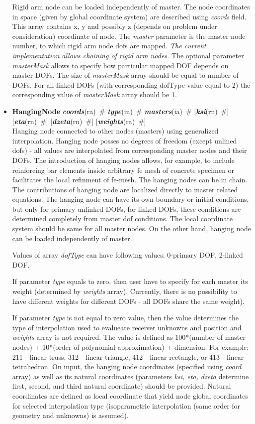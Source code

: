 \documentclass[draft]{article}
\newcommand{\param}[1]{{\em #1}}
\newcommand{\keywordnotype}[1]{\mbox{{\it{\bf{#1}}}}}
\newcommand{\keyword}[2]{\mbox{{\keywordnotype{#1}\tiny (#2)}}}
\newcommand{\entKeywordInst}[1]{\mbox{{\bf{{#1}}}}}
\newcommand{\field}[2]{\mbox{\keyword{#1}{#2}~\#}}
\newcommand{\optField}[2]{\mbox{[\field{#1}{#2}]}}
\begin{document}
\begin{itemize}
Rigid arm node can be loaded
independently of master. The node coordinates in space (given by
global coordinate system) are described using \param{coords}
field. This array contains x, y and possibly z (depends on problem
under consideration) coordinate of node. The \param{master} parameter is the
master node number, to which rigid arm node dofs are mapped.
{\em The current implementation allows chaining of rigid arm nodes.}
The optional parameter \param{masterMask} allows to specify how
particular mapped DOF depends on master DOFs. The size of \param{masterMask} array 
should be equal to number of DOFs. For all linked DOFs (with
corresponding dofType value equal to 2) the corresponding value of
\param{masterMask} array should be 1.

\item
\entKeywordInst{HangingNode}  \field{coords}{ra} \field{type}{in} \field{masters}{ia}
\optField{ksi}{rn} \optField{eta}{rn} \optField{dzeta}{rn} \optField{weights}{ra}\\
Hanging node connected to other nodes (masters) using generalized interpolation.
Hanging node posses no degrees of freedom	(except unlined dofs) - all values are
interpolated from corresponding master nodes and their DOFs.
The introduction of hanging nodes allows, for example, to include reinforcing bar elements inside 
arbitrary fe mesh of concrete specimen or facilitates the local
refinment of fe-mesh. The hanging nodes can be in chain.
The contributions of hanging node are localized directly to master related equations.
The hanging node can have its own boundary or initial conditions, but
only for primary unlinked DOFs, for linked DOFs, these conditions are
determined completely from master dof conditions. 
The local coordinate system should be same for all master nodes.
On the other hand, hanging node can be loaded independently of
master.

Values of array \param{dofType} can have following values: {0-primary
 DOF, 2-linked DOF}.

If parameter \param{type} equals to zero, then user have to specify
for each master its weight (determined by \param{weights} array).
Currently, there is no possibility to have different weights for
different DOFs - all DOFs share the same weight).

If parameter \param{type} is not equal to zero value, then the value determines the type of interpolation used to
evalueate receiver unknowns and position and \param{weights} array is not required. The value is
defined as 100*(number of master nodes) + 10*(order of polynomial
approximation) + dimension. For example: 211 - linear truss, 312 -
linear triangle, 412 - linear rectangle, or 413 - linear tetrahedron.
On input, the hanging node coordinates (specified using
\param{coord} array) as well as its natural coordinates (parameters
\param{ksi, eta, dzeta} determine first, second, and third natural
coordinate) should be provided.  Natural coordinates are
defined as local coordinate that yield node global coordinates for
selected interpolation type (isoparametric interpolation (same order
for geometry and unknowns) is assumed).





\end{itemize}
\end{document}
